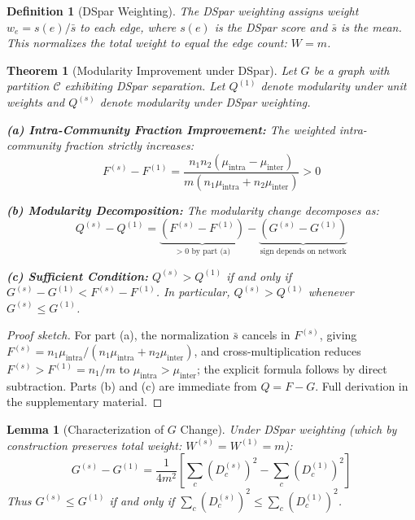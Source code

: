 \documentclass[10pt,journal,compsoc]{IEEEtran}
\newtheorem{theorem}{Theorem}
\newtheorem{lemma}{Lemma}
\newtheorem{definition}{Definition}
\begin{document}
\begin{definition}[DSpar Weighting]
The \emph{DSpar weighting} assigns weight $w_e = s(e)/\bar{s}$ to each edge, where $s(e)$ is the DSpar score and $\bar{s}$ is the mean. This normalizes the total weight to equal the edge count: $W = m$.
\end{definition}

\begin{theorem}[Modularity Improvement under DSpar]
\label{thm:modularity}
Let $G$ be a graph with partition $\mathcal{C}$ exhibiting DSpar separation. Let $Q^{(1)}$ denote modularity under unit weights and $Q^{(s)}$ denote modularity under DSpar weighting.

\textbf{(a) Intra-Community Fraction Improvement:} The weighted intra-community fraction strictly increases:
\begin{equation}
F^{(s)} - F^{(1)} = \frac{n_1 n_2 (\mu_{\text{intra}} - \mu_{\text{inter}})}{m(n_1 \mu_{\text{intra}} + n_2 \mu_{\text{inter}})} > 0
\end{equation}

\textbf{(b) Modularity Decomposition:} The modularity change decomposes as:
\begin{equation}
Q^{(s)} - Q^{(1)} = \underbrace{(F^{(s)} - F^{(1)})}_{> 0 \text{ by part (a)}} - \underbrace{(G^{(s)} - G^{(1)})}_{\text{sign depends on network}}
\end{equation}

\textbf{(c) Sufficient Condition:} $Q^{(s)} > Q^{(1)}$ if and only if $G^{(s)} - G^{(1)} < F^{(s)} - F^{(1)}$.
In particular, $Q^{(s)} > Q^{(1)}$ whenever $G^{(s)} \leq G^{(1)}$.
\end{theorem}

\begin{proof}[Proof sketch]
For part (a), the normalization $\bar{s}$ cancels in $F^{(s)}$, giving $F^{(s)} = n_1 \mu_{\text{intra}} / (n_1 \mu_{\text{intra}} + n_2 \mu_{\text{inter}})$, and cross-multiplication reduces $F^{(s)} > F^{(1)} = n_1/m$ to $\mu_{\text{intra}} > \mu_{\text{inter}}$; the explicit formula follows by direct subtraction. Parts (b) and (c) are immediate from $Q = F - G$. Full derivation in the supplementary material.
\end{proof}

\begin{lemma}[Characterization of $G$ Change]
\label{lem:G_change}
Under DSpar weighting (which by construction preserves total weight: $W^{(s)} = W^{(1)} = m$):
\begin{equation}
G^{(s)} - G^{(1)} = \frac{1}{4m^2} \left[ \sum_c (D_c^{(s)})^2 - \sum_c (D_c^{(1)})^2 \right]
\end{equation}
Thus $G^{(s)} \leq G^{(1)}$ if and only if $\sum_c (D_c^{(s)})^2 \leq \sum_c (D_c^{(1)})^2$.
\end{lemma}
\end{document}
